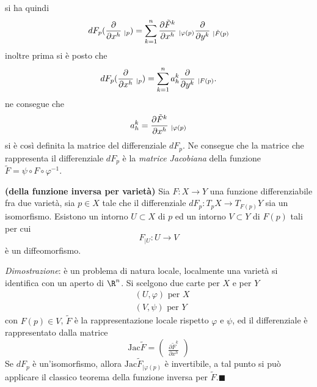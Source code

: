 \documentclass[10pt, letterpaper]{report}
\begin{document}
si ha quindi\begin{equation}
    dF_p(\frac{\partial}{\partial x^h}\hphantom{.}_{|p})=
    \sum_{k=1}^n\frac{\partial\tilde F^k}{\partial x^h}\hphantom{.}_{|\varphi(p)}\frac{\partial}{\partial y^k}\hphantom{.}_{|\tilde F(p)}
\end{equation}
inoltre prima si è posto che 
\begin{equation}
    dF_p(\frac{\partial}{\partial x^h}\hphantom{.}_{|p})=\sum_{k=1}^na^k_h \frac{\partial}{\partial y^k}\hphantom{.}_{|F(p)}.
\end{equation}
ne consegue che \begin{equation}
    a_h^k=\frac{\partial\tilde F^k}{\partial x^h}\hphantom{.}_{|\varphi(p)}
\end{equation}
si è così definita la matrice del differenziale $dF_p$. Ne consegue che la matrice che rappresenta il differenziale $dF_p$ è la \textit{matrice Jacobiana} della funzione $\tilde F=\psi\circ F\circ\varphi^{-1}$. 
\begin{teorema}\label{teo:func_inv_varietà}\textbf{(della funzione inversa per varietà)}
    Sia $F:X\rightarrow Y$ una funzione differenziabile fra due varietà, sia $p\in X$ tale che il differenziale $dF_p:T_pX\rightarrow T_{F(p)}Y$ sia un isomorfismo. Esistono un intorno $U\subset X$ di $p$ ed un intorno $V\subset Y$ di $F(p)$ tali per cui \begin{equation}
        F_{|U}:U\rightarrow V 
    \end{equation}
    è un diffeomorfismo.
\end{teorema}
\textit{Dimostrazione}: è un problema di natura locale, localmente una varietà si identifica con un aperto di $\R^n$. Si scelgono due carte per $X$ e per $Y$\begin{align}
    &(U,\varphi)\text{ per }X\\
    &(V,\psi)\text{ per }Y
\end{align}
con $F(p)\in V$, $\tilde F$ è la rappresentazione locale rispetto $\varphi$ e $\psi$, ed il differenziale è rappresentato dalla matrice\begin{equation}
    \text{Jac}\tilde F=\begin{pmatrix}
       \displaystyle \frac{\partial\tilde F^k}{\partial x^h}
    \end{pmatrix}
\end{equation}
Se $dF_p$ è un'isomorfismo, allora $  \text{Jac}\tilde F_{|\varphi(p)}$ è invertibile, a tal punto si può applicare il classico teorema della funzione inversa per $\tilde F$.\hfill$\blacksquare$\bigskip 
\end{document}
